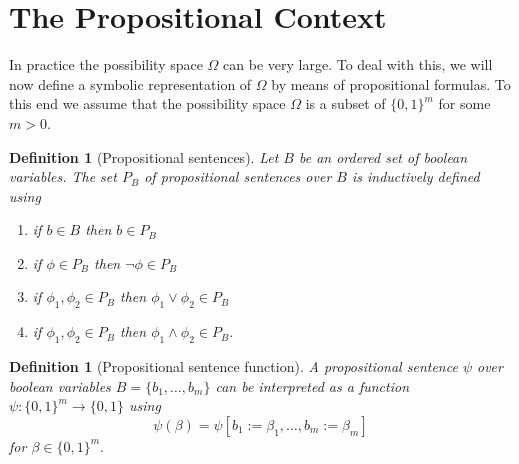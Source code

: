 \documentclass{article}
\theoremstyle{mytheorem}
\newtheorem{definition}[theorem]{Definition}
\newtheorem{question}[theorem]{Question}
\newcommand{\set}[1]{\ensuremath{\{ #1 \} }} %
\begin{document}


\clearpage
\section{The Propositional Context}
In practice the possibility space $\Omega$ can be very large. To deal with this, we will now define a symbolic representation of $\Omega$ by means of propositional formulas. To this end we assume that the possibility space $\Omega$ is a subset of $\set{0,1}^m$ for some $m > 0$. 

\begin{definition}[Propositional sentences]
Let $B$ be an ordered set of boolean variables. The set $P_B$ of \emph{propositional sentences over $B$} is inductively defined using
\begin{enumerate}
    \item if $b \in B$ then $b \in P_B$
    \item if $\phi \in P_B$ then $\neg \phi \in P_B$
    \item if $\phi_1, \phi_2 \in P_B$ then $\phi_1 \lor \phi_2 \in P_B$
    \item if $\phi_1, \phi_2 \in P_B$ then $\phi_1 \land \phi_2 \in P_B.$
\end{enumerate}
\end{definition}

\begin{definition}[Propositional sentence function] \label{def:propositional-sentence-function}
A propositional sentence $\psi$ over boolean variables $B = \set{b_1, \ldots, b_m}$ can be interpreted as a function $\psi: \set{0,1}^m \rightarrow \set{0,1}$ using
\begin{equation} \label{eq:propositional-sentence-function}
  \psi(\beta) = \psi[b_1 := \beta_1, \ldots, b_m := \beta_m]
\end{equation}
for $\beta \in \set{0,1}^m.$
\end{definition}
\end{document}
